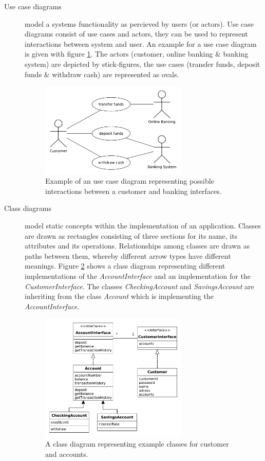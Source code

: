 \documentclass{acmtog} %
\begin{document}
\begin{description}
	\item[Use case diagrams] model a systems functionality as percieved by users (or actors).
	Use case diagrams consist of use cases and actors, they can be used to represent interactions between system and user.
	An example for a use case diagram is given with figure \ref{fig:use-case-diagram}.
	The actors (customer, online banking \& banking system) are depicted by stick-figures, the use cases (transfer funds, deposit funds \& withdraw cash) are represented as ovals.
	\begin{figure}[ht]
		\centerline{\includegraphics[width=7cm]{img/uml-banking/use-case-diagram}}
		\caption{Example of an use case diagram representing possible interactions between a customer and banking interfaces.}
		\label{fig:use-case-diagram}
	\end{figure}

	\item[Class diagrams] model static concepts within the implementation of an application.
	Classes are drawn as rectangles consisting of three sections for its name, its attributes and its operations.
	Relationships among classes are drawn as paths between them, whereby different arrow types have different meanings.
	Figure \ref{fig:class-diagram} shows a class diagram representing different implementations of the \textit{AccountInterface} and an implementation for the \textit{CustomerInterface}.
	The classes \textit{CheckingAccount} and \textit{SavingsAccount} are inheriting from the class \textit{Account} which is implementing the \textit{AccountInterface}.
	\begin{figure}[ht]
		\centerline{\includegraphics[width=7cm]{img/uml-banking/class-diagram}}
		\caption{A class diagram representing example classes for customer and accounts.}
		\label{fig:class-diagram}
	\end{figure}


\end{description}
\end{document}
